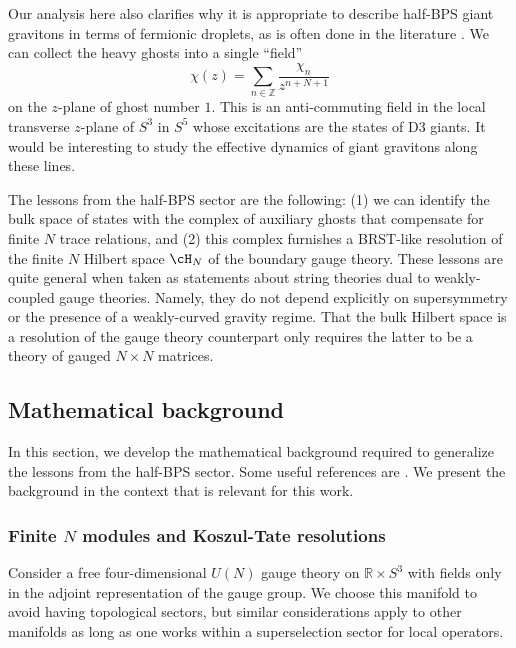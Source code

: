 \documentclass[a4paper,12pt]{article}
\begin{document}
Our analysis here also clarifies why it is appropriate to describe half-BPS giant gravitons in terms of fermionic droplets, as is often done in the literature \cite{Lin:2004nb,Berenstein:2004kk,Dutta:2007ws}. We can collect the heavy ghosts into a single ``field''
\begin{equation}
\chi (z) = \sum_{n \in \mathbb{Z}} \frac{\chi_{n}}{z^{n+N+1}}
\end{equation}
on the $z$-plane of ghost number $1$. This is an anti-commuting field in the local transverse $z$-plane of $S^3$ in $S^5$ whose excitations are the states of D3 giants. It would be interesting to study the effective dynamics of giant gravitons along these lines.

The lessons from the half-BPS sector are the following: (1) we can identify the bulk space of states with the complex of auxiliary ghosts that compensate for finite $N$ trace relations, and (2) this complex furnishes a BRST-like resolution of the finite $N$ Hilbert space $\cH_N$ of the boundary gauge theory. These lessons are quite general when taken as statements about string theories dual to weakly-coupled gauge theories. Namely, they do not depend explicitly on supersymmetry or the presence of a weakly-curved gravity regime. That the bulk Hilbert space is a resolution of the gauge theory counterpart only requires the latter to be a theory of gauged $N \times N$ matrices.


\subsection{Mathematical background} \label{subsec:mathematicalbackground}

In this section, we develop the mathematical background required to generalize the lessons from the half-BPS sector. Some useful references are \cite{Henneaux:1992ig,Eisenbud:1995,Cox:2005,Felder:1988zp}. We present the background in the context that is relevant for this work.

\subsubsection{Finite $N$ modules and Koszul-Tate resolutions} \label{subsubsec:koszultate}

Consider a free four-dimensional $U(N)$ gauge theory on $\mathbb{R} \times S^3$ with fields only in the adjoint representation of the gauge group. We choose this manifold to avoid having topological sectors, but similar considerations apply to other manifolds as long as one works within a superselection sector for local operators.
\end{document}
